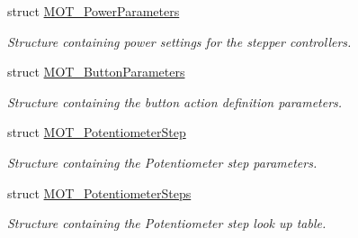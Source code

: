 \begin{DoxyCompactItemize}
struct \hyperlink{struct_m_o_t___power_parameters}{M\+O\+T\+\_\+\+Power\+Parameters}
\begin{DoxyCompactList}\small\item\em Structure containing power settings for the stepper controllers. \end{DoxyCompactList}\item 
struct \hyperlink{struct_m_o_t___button_parameters}{M\+O\+T\+\_\+\+Button\+Parameters}
\begin{DoxyCompactList}\small\item\em Structure containing the button action definition parameters. \end{DoxyCompactList}\item 
struct \hyperlink{struct_m_o_t___potentiometer_step}{M\+O\+T\+\_\+\+Potentiometer\+Step}
\begin{DoxyCompactList}\small\item\em Structure containing the Potentiometer step parameters. \end{DoxyCompactList}\item 
struct \hyperlink{struct_m_o_t___potentiometer_steps}{M\+O\+T\+\_\+\+Potentiometer\+Steps}
\begin{DoxyCompactList}\small\item\em Structure containing the Potentiometer step look up table. \end{DoxyCompactList}\end{DoxyCompactItemize}
